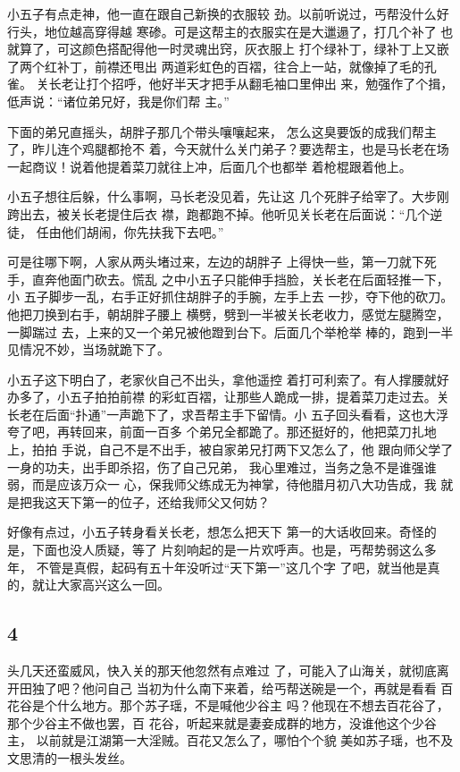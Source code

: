 小五子有点走神，他一直在跟自己新换的衣服较
劲。以前听说过，丐帮没什么好行头，地位越高穿得越
寒碜。可是这帮主的衣服实在是大邋遢了，打几个补了
也就算了，可这颜色搭配得他一时灵魂出窍，灰衣服上
打个绿补丁，绿补丁上又嵌了两个红补丁，前襟还甩出
两道彩虹色的百褶，往合上一站，就像掉了毛的孔雀。
关长老让打个招呼，他好半天才把手从翻毛袖口里伸出
来，勉强作了个揖，低声说：“诸位弟兄好，我是你们帮
主。”

下面的弟兄直摇头，胡胖子那几个带头嚷嚷起来，
怎么这臭要饭的成我们帮主了，昨儿连个鸡腿都抢不
着，今天就什么关门弟子？要选帮主，也是马长老在场
一起商议！说着他提着菜刀就往上冲，后面几个也都举
着枪棍跟着他上。

小五子想往后躲，什么事啊，马长老没见着，先让这
几个死胖子给宰了。大步刚跨出去，被关长老提住后衣
襟，跑都跑不掉。他听见关长老在后面说：“几个逆徒，
任由他们胡闹，你先扶我下去吧。”

可是往哪下啊，人家从两头堵过来，左边的胡胖子
上得快一些，第一刀就下死手，直奔他面门砍去。慌乱
之中小五子只能伸手挡脸，关长老在后面轻推一下，小
五子脚步一乱，右手正好抓住胡胖子的手腕，左手上去
一抄，夺下他的砍刀。他把刀换到右手，朝胡胖子腰上
横劈，劈到一半被关长老收力，感觉左腿腾空，一脚踹过
去，上来的又一个弟兄被他蹬到台下。后面几个举枪举
棒的，跑到一半见情况不妙，当场就跪下了。

小五子这下明白了，老家伙自己不出头，拿他遥控
着打可利索了。有人撑腰就好办多了，小五子拍拍前襟
的彩虹百褶，让那些人跪成一排，提着菜刀走过去。关
长老在后面“扑通”一声跪下了，求吾帮主手下留情。小
五子回头看看，这也大浮夸了吧，再转回来，前面一百多
个弟兄全都跪了。那还挺好的，他把菜刀扎地上，拍拍
手说，自己不是不出手，被自家弟兄打两下又怎么了，他
跟向师父学了一身的功夫，出手即杀招，伤了自己兄弟，
我心里难过，当务之急不是谁强谁弱，而是应该万众一
心，保我师父练成无为神掌，待他腊月初八大功告成，我
就是把我这天下第一的位子，还给我师父又何妨？

好像有点过，小五子转身看关长老，想怎么把天下
第一的大话收回来。奇怪的是，下面也没人质疑，等了
片刻响起的是一片欢呼声。也是，丐帮势弱这么多年，
不管是真假，起码有五十年没听过“天下第一”这几个字
了吧，就当他是真的，就让大家高兴这么一回。
\newline

{\centering\subsection{4}}

头几天还蛮威风，快入关的那天他忽然有点难过
了，可能入了山海关，就彻底离开田独了吧？他问自己
当初为什么南下来着，给丐帮送碗是一个，再就是看看
百花谷是个什么地方。那个苏子瑶，不是喊他少谷主
吗？他现在不想去百花谷了，那个少谷主不做也罢，百
花谷，听起来就是妻妾成群的地方，没谁他这个少谷主，
以前就是江湖第一大淫贼。百花又怎么了，哪怕个个貌
美如苏子瑶，也不及文思清的一根头发丝。

